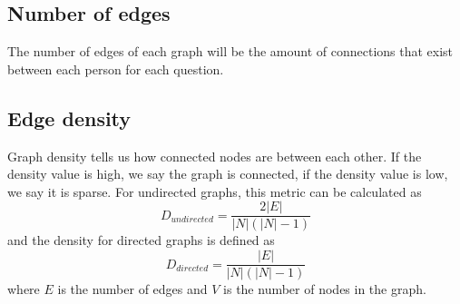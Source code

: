 \subsection{Number of edges}
The number of edges of each graph will be the amount of connections that exist between each person for each question.

\subsection{Edge density}
Graph density tells us how connected nodes are between each other. If the density value is high, we say the graph is connected, if the density value is low, we say it is sparse. For undirected graphs, this metric can be calculated as
\begin{equation}
    D_{undirected} = \frac{2|E|}{|N|(|N|-1)}
    \label{equation:dir_density}
\end{equation}
and the density for directed graphs is defined as
\begin{equation}
    D_{directed} = \frac{|E|}{|N|(|N|-1)}
    \label{equation:undir_density}
\end{equation}
where $E$ is the number of edges and $V$ is the number of nodes in the graph.

